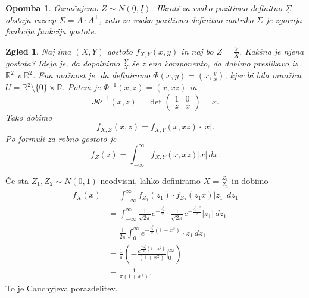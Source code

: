 \documentclass[10pt, a4paper]{article}
\newtheorem*{opomba}{Opomba}
\newtheorem{zgled}[izr]{Zgled}
\newcommand{\R}{\mathbb {R}}
\begin{document}
  \begin{opomba}
    Označujemo $Z \sim N(\underline{0}, \underline{I})$. Hkrati za vsako pozitivno definitno $\underline{\Sigma}$
    obstaja razcep $\underline{\Sigma} = \underline{A} \cdot \underline{A}^\top$, zato za vsako pozitivno definitno matriko $\underline{\Sigma}$
    je zgornja funkcija funkcija gostote. 
  \end{opomba}

  \begin{zgled}
    Naj ima $(X, Y)$ gostoto $f_{X, Y} (x, y)$ in naj bo $Z = \frac{Y}{X}$. Kakšna je njena gostota?
    Ideja je, da dopolnimo $\frac{Y}{X}$ še z eno komponento, da dobimo preslikavo iz $\R^2$ v $\R^2$.
    Ena možnost je, da definiramo $\Phi(x, y) = (x, \frac{y}{x})$, kjer bi bila množica 
    $U = \R^2 \setminus \{0\} \times \R$. Potem je $\Phi^{-1} (x, z) = (x, xz)$ in 
    $$J \Phi^{-1} (x, z) = \det \begin{pmatrix}
      1 & 0\\
      z & x
    \end{pmatrix} = x.$$
    Tako dobimo $$f_{X, Z} (x, z) = f_{X, Y} (x, xz) \cdot |x|.$$
    Po formuli za robno gostoto je 
    $$f_Z(z) = \int_{-\infty} ^\infty f_{X, Y} (x, xz) |x|\, dx.$$
  \end{zgled}

  Če sta $Z_1, Z_2 \sim N(0, 1)$ neodvisni, lahko definiramo $X = \frac{Z_1}{Z_2}$ in dobimo 
  \begin{align*}
    f_{X} (x) &= \int_{-\infty} ^\infty f_{Z_1} (z_1) \cdot f_{Z_2} (z_1 x) |z_1|\, dz_1\\
    &= \int_{-\infty} ^\infty \frac{1}{\sqrt{2 \pi}} e^{-\frac{z_1^2}{2}} \cdot \frac{1}{\sqrt{2 \pi}} e^{-\frac{z_1^2 x^2}{2}} |z_1|\, dz_1\\
    &= \frac{1}{2\pi} \int_0 ^\infty e^{-\frac{z_1^2}{2} (1 + x^2)} \cdot z_1\, dz_1\\
    &= \frac{1}{\pi} \left(-\frac{e^{\frac{-z_1^2}{2} (1 + x^2)}}{(1 + x^2)} \big|_{0} ^\infty \right)\\
    &= \frac{1}{\pi (1 + x^2)}.
  \end{align*}
  To je Cauchyjeva porazdelitev.
\end{document}
